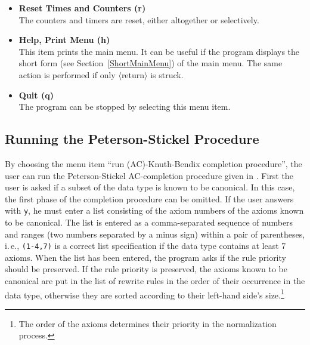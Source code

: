 \begin{itemize}
\item {\bf Reset Times and Counters (r)}\\
The counters and timers are reset, either altogether or selectively.

\item {\bf Help, Print Menu (h)}\\
This item prints the main menu. It can be useful if the program
displays the short form (see Section~\ref{ShortMainMenu}) of the main menu.
The same action is performed if only $\langle$return$\rangle$ is struck.

\item {\bf Quit (q)}\\
The program can be stopped by selecting this menu item.
\end{itemize}

\subsection{Running the Peterson-Stickel Procedure}
\label{AC-KBCompletion}
By choosing the menu item ``run (AC)-Knuth-Bendix completion procedure'',
the user can run the Peterson-Stickel 
AC-completion procedure given in \cite{PetersonStickel:81}.
First the user is asked if a subset of the data type is known to be
canonical. 
In this case, the first phase of the completion procedure can be omitted.
If the user answers with {\tt y}, he must enter a list
consisting of the axiom numbers of the axioms known to be canonical.
The list is entered as a comma-separated sequence of numbers
and ranges (two numbers separated by a minus sign) within
a pair of parentheses, i.\,e., {\tt (1-4,7)} is a correct list
specification if the data type contains at least 7 axioms. 
When the list has been entered, the program asks if the rule priority
should be preserved.
If the rule priority is preserved, the axioms known to be canonical are
put in the list of rewrite rules in the order of their occurrence in
the data type, otherwise they are sorted according to their left-hand
side's size.\footnote{The order of the axioms determines their priority
in the normalization process.}

